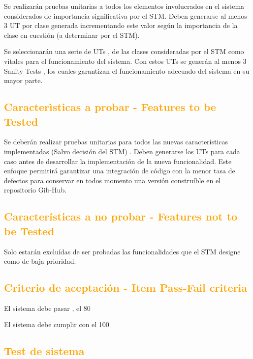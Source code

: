 Se realizarán pruebas unitarias a todos los elementos involucrados en el sistema considerados de importancia significativa por el STM. Deben generarse al menos 3 UT por clase generada incrementando este valor según la importancia de la clase en cuestión (a determinar por el STM).

	Se seleccionarán una serie de UTs , de las clases consideradas por el STM como vitales para el funcionamiento del sistema. Con estos UTs se generán al menos 3 Sanity Tests , los cuales garantizan el funcionamiento adecuado del sistema en su mayor parte.


\subsection{\textcolor{orange}{Caracterìsticas a probar - Features to be Tested}}

Se deberán realizar pruebas unitarias para todos las nuevas características implementadas (Salvo decisión del STM) . Deben generarse los UTs para cada caso antes de desarrollar la implementación de la nueva funcionalidad. Este enfoque permitirá garantizar una integración de código con la menor tasa de defectos para conservar en todos momento una versión construíble en el repositorio Gib-Hub.

\subsection{\textcolor{orange}{Características a no probar - Features not to be Tested }}

Solo estarán excluídas de ser probadas las funcionalidades que el STM designe como de baja prioridad. 

\subsection{\textcolor{orange}{Criterio de aceptación - Item Pass-Fail criteria }}

El sistema debe pasar , el 80 %

El sistema debe cumplir con el 100 %

\subsection{\textcolor{orange}{Test de sistema }}


